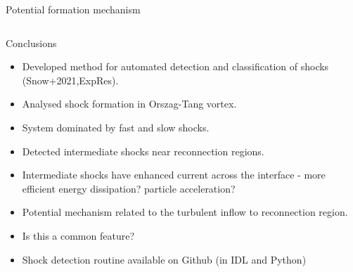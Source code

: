 \documentclass[10pt,aspectratio=169,usenames,dvipsnames]{beamer}
\begin{document}
\begin{frame}{Potential formation mechanism}
\begin{columns}
\begin{column}{0.5\textwidth}
\end{column}
\end{columns}
\end{frame}

\begin{frame}{Conclusions}
\begin{itemize}
    \item Developed method for automated detection and classification of shocks (Snow+2021,ExpRes).
    \item Analysed shock formation in Orszag-Tang vortex.
    \item System dominated by fast and slow shocks.
    \item Detected intermediate shocks near reconnection regions.
    \item Intermediate shocks have enhanced current across the interface - more efficient energy dissipation? particle acceleration?
    \item Potential mechanism related to the turbulent inflow to reconnection region.
    \item Is this a common feature?
    \item Shock detection routine available on Github (in IDL and Python)
\end{itemize}
\end{frame}
\end{document}
